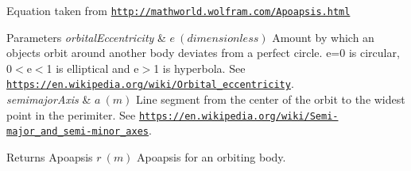 Equation taken from \href{http://mathworld.wolfram.com/Apoapsis.html}{\tt http\+://mathworld.\+wolfram.\+com/\+Apoapsis.\+html}


\begin{DoxyParams}{Parameters}
{\em orbital\+Eccentricity} & $ e\ (dimensionless)$ Amount by which an objects orbit around another body deviates from a perfect circle. e=0 is circular, 0$<$e$<$1 is elliptical and e$>$1 is hyperbola. See \href{https://en.wikipedia.org/wiki/Orbital_eccentricity}{\tt https\+://en.\+wikipedia.\+org/wiki/\+Orbital\+\_\+eccentricity}. \\
\hline
{\em semimajor\+Axis} & $ a\ (m)$ Line segment from the center of the orbit to the widest point in the perimiter. See \href{https://en.wikipedia.org/wiki/Semi-major_and_semi-minor_axes}{\tt https\+://en.\+wikipedia.\+org/wiki/\+Semi-\/major\+\_\+and\+\_\+semi-\/minor\+\_\+axes}. \\
\hline
\end{DoxyParams}
\begin{DoxyReturn}{Returns}
Apoapsis $ r\ (m)$ Apoapsis for an orbiting body. 
\end{DoxyReturn}
